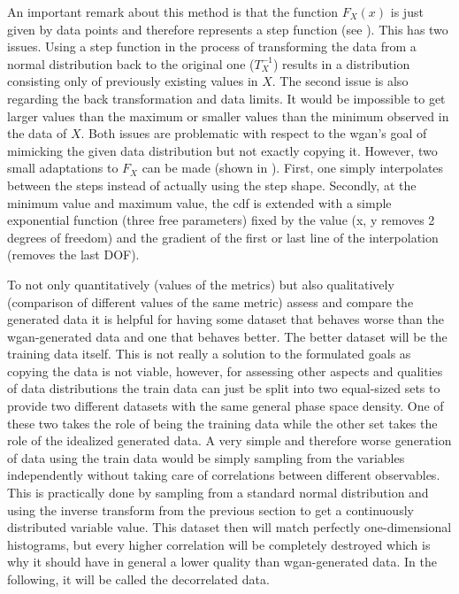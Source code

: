 An important remark about this method is that the function \(F_X(x)\) is just given by data points and therefore represents a step function (see ). This has two issues. Using a step function in the process of transforming the data from a normal distribution back to the original one (\(T_X^{-1}\)) results in a distribution consisting only of previously existing values in \(X\). The second issue is also regarding the back transformation and data limits. It would be impossible to get larger values than the maximum or smaller values than the minimum observed in the data of \(X\). Both issues are problematic with respect to the \gls{wgan}'s goal of mimicking the given data distribution but not exactly copying it. However, two small adaptations to \(F_X\) can be made (shown in ). First, one simply interpolates between the steps instead of actually using the step shape. Secondly, at the minimum value and maximum value, the \gls{cdf} is extended with a simple exponential function (three free parameters) fixed by the value (x, y removes 2 degrees of freedom) and the gradient of the first or last line of the interpolation (removes the last DOF).


To not only quantitatively (values of the metrics) but also qualitatively (comparison of different values of the same metric) assess and compare the generated data it is helpful for having some dataset that behaves worse than the \gls{wgan}-generated data and one that behaves better. The better dataset will be the training data itself. This is not really a solution to the formulated goals as copying the data is not viable, however, for assessing other aspects and qualities of data distributions the train data can just be split into two equal-sized sets to provide two different datasets with the same general phase space density. One of these two takes the role of being the training data while the other set takes the role of the idealized generated data. A very simple and therefore worse generation of data using the train data would be simply sampling from the variables independently without taking care of correlations between different observables. This is practically done by sampling from a standard normal distribution and using the inverse transform from the previous section to get a continuously distributed variable value. This dataset then will match perfectly one-dimensional histograms, but every higher correlation will be completely destroyed which is why it should have in general a lower quality than \gls{wgan}-generated data. In the following, it will be called the decorrelated data.

